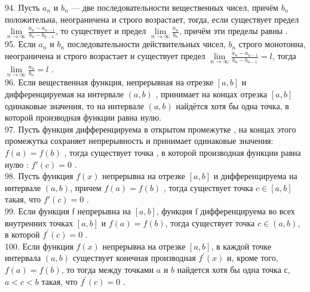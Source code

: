\documentclass[12pt]{article}
\begin{document}
94. Пусть ${\displaystyle a_{n}}$ и ${\displaystyle b_{n}}$  — две последовательности вещественных чисел, причём ${\displaystyle b_{n}}$ положительна, неограничена и строго возрастает, тогда, если существует предел ${\displaystyle \lim \limits _{n\to \infty }{\frac {a_{n}-a_{n-1}}{b_{n}-b_{n-1}}}}$, то существует и предел ${\displaystyle \lim \limits _{n\to \infty }{\frac {a_{n}}{b_{n}}}}$, причём эти пределы равны .\\

95. Если ${\displaystyle a_{n}}$ и ${\displaystyle b_{n}}$ последовательности действительных чисел, ${\displaystyle b_{n}}$ строго монотонна, неограничена и строго возрастает и существует предел ${\displaystyle \lim \limits _{n\to \infty }{\frac {a_{n}-a_{n-1}}{b_{n}-b_{n-1}}}=l}$, тогда ${\displaystyle \lim \limits _{n\to \infty } \frac {a_{n}}{b_{n}}=l}$ .\\

96. Если вещественная функция, непрерывная на отрезке ${\displaystyle [a,b]}$ и дифференцируемая на интервале ${\displaystyle (a,b)}$ , принимает на концах отрезка ${\displaystyle [a,b]}$ одинаковые значения, то на интервале ${\displaystyle (a,b)}$ найдётся хотя бы одна точка, в которой производная функции равна нулю.\\

97. Пусть функция  дифференцируема в открытом промежутке , на концах этого промежутка сохраняет непрерывность и принимает одинаковые значения: ${\displaystyle f(a)=f(b)}$ , тогда существует точка  , в которой производная функции  равна нулю : ${\displaystyle f'(c)=0}$  .\\

98. Пусть функция ${\displaystyle f(x)}$ непрерывна на отрезке ${\displaystyle [a,b]}$ и дифференцируема на интервале ${\displaystyle (a,b)}$, причем ${\displaystyle f(a)=f(b)}$ , тогда существует точка ${\displaystyle c \in [a, b]}$ такая, что ${\displaystyle f'(c)=0}$ .\\

99. Если функция f непрерывна на ${\displaystyle [a,b]}$, функция f дифференцируема во всех внутренних точках ${\displaystyle [a,b]}$ и ${\displaystyle f(a)=f(b)}$, тогда существует точка ${\displaystyle c\in (a,b)}$, в которой ${\displaystyle f^{\prime}(c)=0}$ .\\

100. Если функция ${\displaystyle f(x)}$  непрерывна на отрезке ${\displaystyle [a,b]}$, в каждой точке интервала ${\displaystyle (a,b)}$ существует конечная производная ${\displaystyle f^{\prime}(x)}$ и, кроме того,${\displaystyle f(a)=f(b)}$, то тогда между точками ${\displaystyle a}$ и ${\displaystyle b}$ найдется хотя бы одна точка ${\displaystyle с}$,${\displaystyle a<c<b}$ такая, что ${\displaystyle f^{\prime}(c)=0}$ .\\
\end{document}
